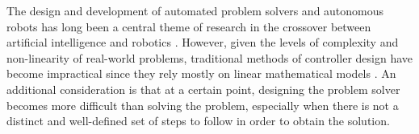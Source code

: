 



The design and development of automated problem solvers and autonomous robots has long been a central theme of research in the crossover between artificial intelligence and robotics \cite{RefWorks:33}. However, given the levels of complexity and non-linearity of real-world problems, traditional methods of controller design have become impractical since they rely mostly on linear mathematical models \cite{RefWorks:32}. An additional consideration is that at a certain point, designing the problem solver becomes more difficult than solving the problem, especially when there is not a distinct and well-defined set of steps to follow in order to obtain the solution.

